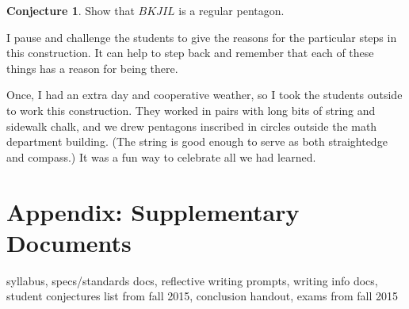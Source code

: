 \documentclass{tufte-handout}
\theoremstyle{definition}
\newtheorem{conjecture}[problem]{Conjecture}
\begin{document}
\begin{conjecture}\label{conj:pentagon-3}
Show that $BKJIL$ is a regular pentagon.
\end{conjecture}

I pause and challenge the students to give the reasons for the particular steps in this construction. It can help to step back and remember that each of these things has a reason for being there.

Once, I had an extra day and cooperative weather, so I took the students outside to work this construction. They worked in pairs with long bits of string and sidewalk chalk, and we drew pentagons inscribed in circles outside the math department building. (The string is good enough to serve as both straightedge and compass.) It was a fun way to celebrate all we had learned.


\clearpage
\section{Appendix: Supplementary Documents}

syllabus, specs/standards docs, reflective writing prompts,  writing info docs, student conjectures list from fall 2015, conclusion handout, exams from fall 2015
\end{document}
